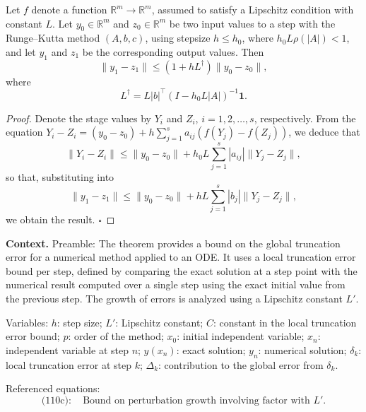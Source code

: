 \begin{lemma}

  \label{lem:319A}
Let \( f \) denote a function \( \mathbb{R}^m \to \mathbb{R}^m \), assumed to satisfy a Lipschitz condition with constant \( L \). Let \( y_0 \in \mathbb{R}^m \) and \( z_0 \in \mathbb{R}^m \) be two input values to a step with the Runge--Kutta method \( (A, b, c) \), using stepsize \( h \leq h_0 \), where \( h_0 L \rho(|A|) < 1 \), and let \( y_1 \) and \( z_1 \) be the corresponding output values. Then
\[
\| y_1 - z_1 \| \leq (1 + h L^\dagger) \| y_0 - z_0 \|,
\]
where
\[
L^\dagger = L |b|^\top (I - h_0 L |A|)^{-1} \mathbf{1}.
\]
\end{lemma}

\begin{proof}
Denote the stage values by \( Y_i \) and \( Z_i \), \( i = 1, 2, \dots, s \), respectively. From the equation \( Y_i - Z_i = (y_0 - z_0) + h \sum_{j=1}^s a_{ij} (f(Y_j) - f(Z_j)) \), we deduce that
\[
\| Y_i - Z_i \| \leq \| y_0 - z_0 \| + h_0 L \sum_{j=1}^s |a_{ij}| \| Y_j - Z_j \|,
\]
so that, substituting into
\[
\| y_1 - z_1 \| \leq \| y_0 - z_0 \| + h L \sum_{j=1}^s |b_j| \| Y_j - Z_j \|,
\]
we obtain the result. \hfill $\square$
\end{proof}

\noindent\textbf{Context.}
Preamble: The theorem provides a bound on the global truncation error for a numerical method applied to an ODE. It uses a local truncation error bound per step, defined by comparing the exact solution at a step point with the numerical result computed over a single step using the exact initial value from the previous step. The growth of errors is analyzed using a Lipschitz constant \(L'\).

Variables: \(h\): step size; \(L'\): Lipschitz constant; \(C\): constant in the local truncation error bound; \(p\): order of the method; \(x_0\): initial independent variable; \(x_n\): independent variable at step \(n\); \(y(x_n)\): exact solution; \(y_n\): numerical solution; \(\delta_k\): local truncation error at step \(k\); \(\Delta_k\): contribution to the global error from \(\delta_k\).

Referenced equations:
\begin{equation}
\text{(110c)}: \quad \text{Bound on perturbation growth involving factor with } L'.
\end{equation}

